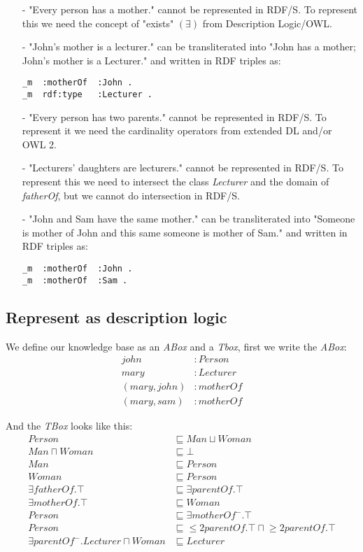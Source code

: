 \documentclass[a4paper,12pt]{article}
\begin{document}
\begin{itemize}
\item[-]"Every person has a mother." cannot be represented in RDF/S.  To
represent this we need the concept of "exists" $(\exists)$ from Description
Logic/OWL.

\item[-]"John’s mother is a lecturer." can be transliterated into "John has a
mother; John's mother is a Lecturer." and written in RDF triples as:
\begin{Verbatim}[samepage=true]
_m  :motherOf  :John .
_m  rdf:type   :Lecturer .
\end{Verbatim}

\item[-]"Every person has two parents." cannot be represented in RDF/S.  To
represent it we need the cardinality operators from extended DL and/or OWL 2.

\item[-]"Lecturers’ daughters are lecturers." cannot be represented in RDF/S.
To represent this we need to intersect the class \emph{Lecturer} and the domain
of \emph{fatherOf}, but we cannot do intersection in RDF/S.

\item[-]"John and Sam have the same mother." can be transliterated into
"Someone is mother of John and this same someone is mother of Sam." and written
in RDF triples as:
\begin{Verbatim}[samepage=true]
_m  :motherOf  :John .
_m  :motherOf  :Sam .
\end{Verbatim}
\end{itemize}

\subsection[DL representation]{Represent as description logic}
We define our knowledge base as an \emph{ABox} and a \emph{Tbox}, first we
write the \emph{ABox}:
\begin{align*}
john         &: Person\\
mary         &: Lecturer\\
(mary, john) &: motherOf\\
(mary, sam)  &: motherOf
\end{align*}

And the \emph{TBox} looks like this:
\begin{align*}
               Person &\sqsubseteq Man \sqcup Woman\\
     Man \sqcap Woman &\sqsubseteq \bot\\
                  Man &\sqsubseteq Person\\
                Woman &\sqsubseteq Person\\
\exists fatherOf.\top &\sqsubseteq \exists parentOf.\top\\
\exists motherOf.\top &\sqsubseteq Woman\\
               Person &\sqsubseteq \exists motherOf^-.\top\\
Person &\sqsubseteq {}\leq2parentOf.\top {}\sqcap {}\geq2parentOf.\top\\
\exists parentOf^-.Lecturer \sqcap Woman &\sqsubseteq Lecturer
\end{align*}
\end{document}
